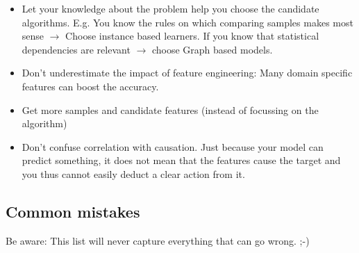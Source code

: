\documentclass[
]{book}
\begin{document}
\begin{itemize}
\item
  Let your knowledge about the problem help you choose the candidate
  algorithms. E.g. You know the rules on which comparing samples makes
  most sense \(\rightarrow\) Choose instance based learners. If you know
  that statistical dependencies are relevant \(\rightarrow\) choose
  Graph based models.
\item
  Don't underestimate the impact of feature engineering: Many domain
  specific features can boost the accuracy.
\item
  Get more samples and candidate features (instead of focussing on the
  algorithm)
\item
  Don't confuse correlation with causation. Just because your model
  can predict something, it does not mean that the features cause the
  target and you thus cannot easily deduct a clear action from it.
\end{itemize}

\hypertarget{common-mistakes}{%
\subsection{Common mistakes}\label{common-mistakes}}

Be aware: This list will never capture everything that can go wrong. ;-)
\end{document}
